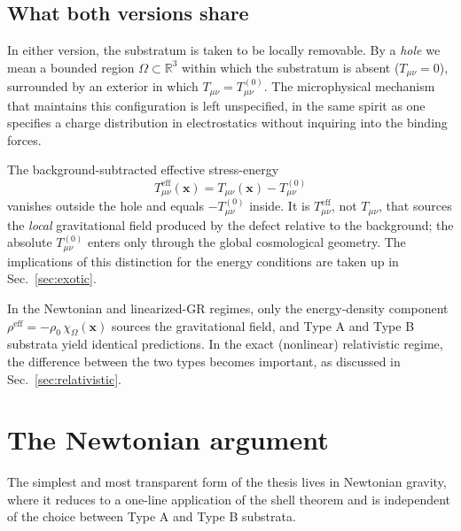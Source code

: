 \documentclass[%
  reprint,
  superscriptaddress,
  showpacs,
  showkeys,
  amsmath,amssymb,
  pra,
  longbibliography,
  floatfix,
  x11names
]{revtex4-2}
\begin{document}
\subsection{What both versions share}

In either version, the substratum is taken to be locally removable. By a \emph{hole} we mean a bounded region $\Omega \subset \mathbb{R}^3$ within which the substratum is absent ($T_{\mu\nu} = 0$), surrounded by an exterior in which $T_{\mu\nu} = T^{(0)}_{\mu\nu}$. The microphysical mechanism that maintains this configuration is left unspecified, in the same spirit as one specifies a charge distribution in electrostatics without inquiring into the binding forces.

The background-subtracted effective stress-energy
\begin{equation}
T^{\mathrm{eff}}_{\mu\nu}(\mathbf{x}) = T_{\mu\nu}(\mathbf{x}) - T^{(0)}_{\mu\nu}
\label{eq:Teff_def}
\end{equation}
vanishes outside the hole and equals $-T^{(0)}_{\mu\nu}$ inside. It is $T^{\mathrm{eff}}_{\mu\nu}$, not $T_{\mu\nu}$, that sources the \emph{local} gravitational field produced by the defect relative to the background; the absolute $T^{(0)}_{\mu\nu}$ enters only through the global cosmological geometry. The implications of this distinction for the energy conditions are taken up in Sec.~\ref{sec:exotic}.

In the Newtonian and linearized-GR regimes, only the energy-density component $\rho^{\mathrm{eff}} = -\rho_0\, \chi_\Omega(\mathbf{x})$ sources the gravitational field, and Type A and Type B substrata yield identical predictions. In the exact (nonlinear) relativistic regime, the difference between the two types becomes important, as discussed in Sec.~\ref{sec:relativistic}.

\section{The Newtonian argument}
\label{sec:newtonian}

The simplest and most transparent form of the thesis lives in Newtonian gravity, where it reduces to a one-line application of the shell theorem and is independent of the choice between Type A and Type B substrata.
\end{document}
